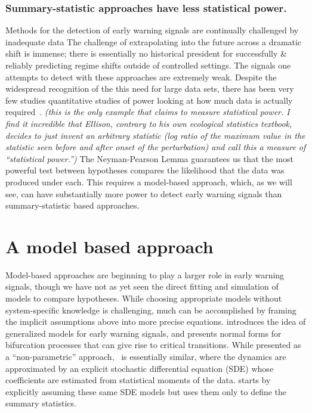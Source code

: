 \documentclass[authoryear,review,11pt]{elsarticle}
\newcommand{\cb}[1]{{\it (#1)}}
\begin{document}
\subsubsection*{Summary-statistic approaches have less statistical power.}
Methods for the detection of early warning signals are continually challenged by 
inadequate data  %
The challenge of extrapolating into the future across a dramatic shift is immense;
there is essentially no historical president for successfully \& reliably predicting regime shifts
outside of controlled settings. %
The signals one attempts to detect with these approaches are extremely weak.
Despite the widespread recognition of the this need for large data sets, 
there has been very few studies quantitative studies of power looking at how much data is actually required~\citep{Contamin2009}.
\cb{this is the only example that claims to measure statistical power.  I find it incredible that Ellison, contrary to his own ecological statistics textbook, decides to just invent an arbitrary statistic (log ratio of the maximum value in the statistic seen before and after onset of the perturbation) and call this a measure of ``statistical power.''}
The Neyman-Pearson Lemma guarantees us that the most powerful test between hypotheses compares the 
likelihood that the data was produced under each. This requires a model-based approach, which,
as we will see, can have substantially more power to detect early warning signals than summary-statistic based approaches.  


\section{A model based approach}
Model-based approaches are beginning to play a larger role in early warning signals, 
though we have not as yet seen the direct fitting and simulation of models to compare hypotheses.  
While choosing appropriate models without system-specific knowledge is challenging, 
much can be accomplished by framing the implicit assumptions above into more precise equations.
\citet{Lade2011} introduces the idea of generalized models for early warning signals, and 
\citet{Kuehn2011} presents normal forms for bifurcation processes that can give rise to critical transitions.  
While presented as a ``non-parametric'' approach,~\citet{Carpenter2011e} is essentially similar, where the dynamics are approximated 
by an explicit stochastic differential equation (SDE) whose coefficients are estimated from statistical moments of the data. \citet{Dakos2011a} starts by explicitly assuming these same SDE models but uses them only to define the summary statistics.  
\end{document}
